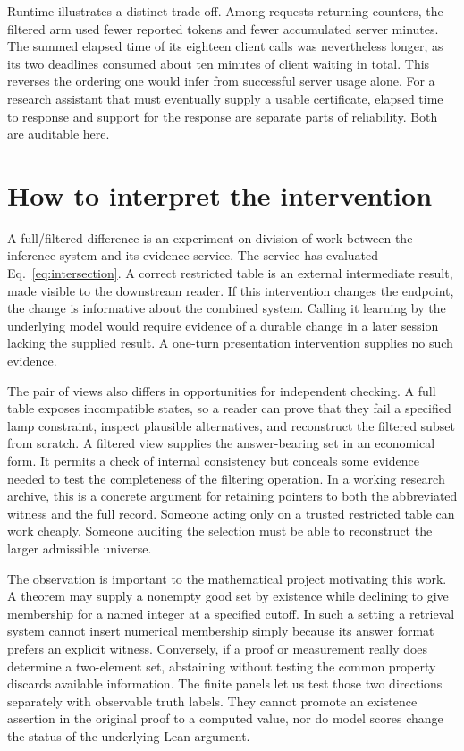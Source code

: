 \documentclass[12pt,letterpaper]{article}
\begin{document}
Runtime illustrates a distinct trade-off. Among requests returning counters, the filtered arm used fewer reported tokens and fewer accumulated server minutes. The summed elapsed time of its eighteen client calls was nevertheless longer, as its two deadlines consumed about ten minutes of client waiting in total. This reverses the ordering one would infer from successful server usage alone. For a research assistant that must eventually supply a usable certificate, elapsed time to response and support for the response are separate parts of reliability. Both are auditable here.


\section{How to interpret the intervention}

A full/filtered difference is an experiment on division of work between the inference system and its evidence service. The service has evaluated Eq.~\eqref{eq:intersection}. A correct restricted table is an external intermediate result, made visible to the downstream reader. If this intervention changes the endpoint, the change is informative about the combined system. Calling it learning by the underlying model would require evidence of a durable change in a later session lacking the supplied result. A one-turn presentation intervention supplies no such evidence.

The pair of views also differs in opportunities for independent checking. A full table exposes incompatible states, so a reader can prove that they fail a specified lamp constraint, inspect plausible alternatives, and reconstruct the filtered subset from scratch. A filtered view supplies the answer-bearing set in an economical form. It permits a check of internal consistency but conceals some evidence needed to test the completeness of the filtering operation. In a working research archive, this is a concrete argument for retaining pointers to both the abbreviated witness and the full record. Someone acting only on a trusted restricted table can work cheaply. Someone auditing the selection must be able to reconstruct the larger admissible universe.

The observation is important to the mathematical project motivating this work. A theorem may supply a nonempty good set by existence while declining to give membership for a named integer at a specified cutoff. In such a setting a retrieval system cannot insert numerical membership simply because its answer format prefers an explicit witness. Conversely, if a proof or measurement really does determine a two-element set, abstaining without testing the common property discards available information. The finite panels let us test those two directions separately with observable truth labels. They cannot promote an existence assertion in the original proof to a computed value, nor do model scores change the status of the underlying Lean argument.
\end{document}

